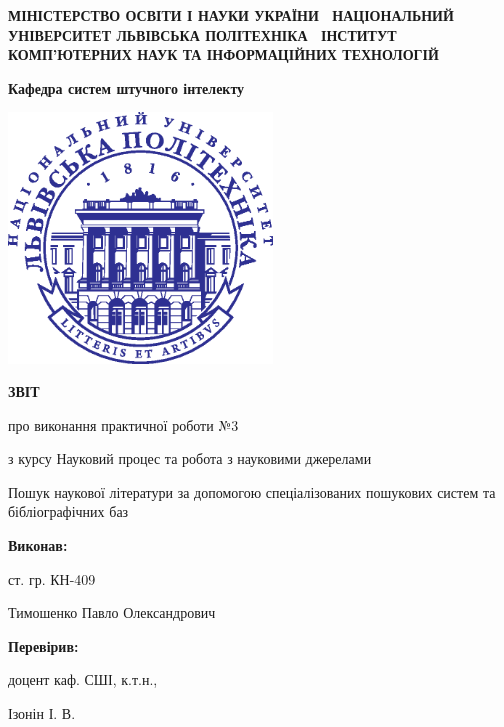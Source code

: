 \documentclass[oneside,14pt,a4paper]{extreport}
\newcommand \labno    {3}
\newcommand \course   {Науковий процес та робота з науковими джерелами}
\newcommand \group    {409}
\newcommand \lecturer {Ізонін І. В.}
\newcommand \theme    {Пошук наукової літератури за допомогою спеціалізованих пошукових систем та бібліографічних баз}
\begin{document}
\begin{titlepage}

\centering
 \textbf{
  МІНІСТЕРСТВО ОСВІТИ І НАУКИ УКРАЇНИ \
  НАЦІОНАЛЬНИЙ УНІВЕРСИТЕТ \flqq{}ЛЬВІВСЬКА ПОЛІТЕХНІКА\frqq{} \
  ІНСТИТУТ КОМП’ЮТЕРНИХ НАУК ТА ІНФОРМАЦІЙНИХ ТЕХНОЛОГІЙ
 }

\vspace{0.5cm}
 \textbf{
  Кафедра систем штучного інтелекту
}

\vspace*{\fill}

  {
    \centering
    \includegraphics[width=7cm]{imgs/logo.eps}
  }

\vspace{1cm}

  {\textbf{ЗВІТ} \par{}
  {про виконання практичної роботи №\labno}
   \par}
  {з курсу \flqq{}\course\frqq{} \par}

\vspace{1cm} \theme

\raggedleft\vfill

 {\textbf{Виконав:} \par}
 {ст. гр. КН-\group \par}
 {Тимошенко Павло Олександрович \par}


 {\textbf{Перевірив:} \par}
 {доцент каф. СШІ, к.т.н.,}
 {\lecturer \par}

\vspace{1cm}


\end{titlepage}
\end{document}
